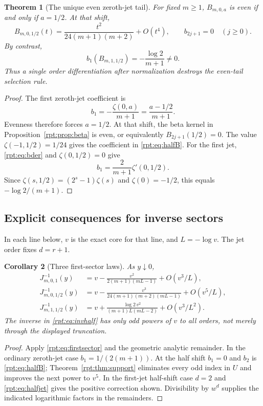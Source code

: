 \documentclass[11pt,a4paper]{article}
\numberwithin{equation}{section}
\newtheorem{theorem}{Theorem}[section]
\newtheorem{corollary}[theorem]{Corollary}
\theoremstyle{definition}\newtheorem{definition}[theorem]{Definition}
\theoremstyle{remark}\newtheorem{remark}[theorem]{Remark}
\begin{document}
\begin{theorem}[The unique even zeroth-jet tail]
\label{rpt:thm:half}
For fixed $m\ge1$, $B_{m,0,a}$ is even if and only if $a=1/2$. At that shift,
\begin{equation}
B_{m,0,1/2}(t)
=\frac{t^2}{24(m+1)(m+2)}+O(t^4),
\qquad b_{2j+1}=0\quad(j\ge0).
\label{rpt:eq:halfB}
\end{equation}
By contrast,
\begin{equation}
b_1(B_{m,1,1/2})=-\frac{\log2}{m+1}\ne0.
\label{rpt:eq:halfjet}
\end{equation}
Thus a single order differentiation after normalization destroys the even-tail selection rule.
\end{theorem}
\begin{proof}
The first zeroth-jet coefficient is
\[
b_1=-\frac{\zeta(0,a)}{m+1}=\frac{a-1/2}{m+1}.
\]
Evenness therefore forces $a=1/2$. At that shift, the beta kernel in Proposition~\ref{rpt:prop:beta} is even, or equivalently $B_{2j+1}(1/2)=0$. The value $\zeta(-1,1/2)=1/24$ gives the coefficient in \eqref{rpt:eq:halfB}. For the first jet, \eqref{rpt:eq:bder} and $\zeta(0,1/2)=0$ give
\[
b_1=\frac{2}{m+1}\zeta'(0,1/2).
\]
Since $\zeta(s,1/2)=(2^s-1)\zeta(s)$ and $\zeta(0)=-1/2$, this equals $-\log2/(m+1)$.
\end{proof}

\subsection{Explicit consequences for inverse sectors}

In each line below, $v$ is the exact core for that line, and $L=-\log v$. The jet order fixes $d=r+1$.

\begin{corollary}[Three first-sector laws]
\label{rpt:cor:firstlaws}
As $y\downarrow0$,
\begin{align}
J_{m,0,1}^{-1}(y)
&=v-\frac{v^2}{2(m+1)(mL-1)}+O(v^3/L),
\label{rpt:eq:invordinary}\\
J_{m,0,1/2}^{-1}(y)
&=v-\frac{v^3}{24(m+1)(m+2)(mL-1)}+O(v^5/L),
\label{rpt:eq:invhalf}\\
J_{m,1,1/2}^{-1}(y)
&=v+\frac{\log2\,v^2}{(m+1)L(mL-2)}+O(v^3/L^2).
\label{rpt:eq:invhalfjet}
\end{align}
The inverse in \eqref{rpt:eq:invhalf} has only odd powers of $v$ to all orders, not merely through the displayed truncation.
\end{corollary}
\begin{proof}
Apply \eqref{rpt:eq:firstsector} and the geometric analytic remainder. In the ordinary zeroth-jet case $b_1=1/(2(m+1))$. At the half shift $b_1=0$ and $b_2$ is \eqref{rpt:eq:halfB}; Theorem~\ref{rpt:thm:support} eliminates every odd index in $U$ and improves the next power to $v^5$. In the first-jet half-shift case $d=2$ and \eqref{rpt:eq:halfjet} gives the positive correction shown. Divisibility by $w^d$ supplies the indicated logarithmic factors in the remainders.
\end{proof}
\end{document}
